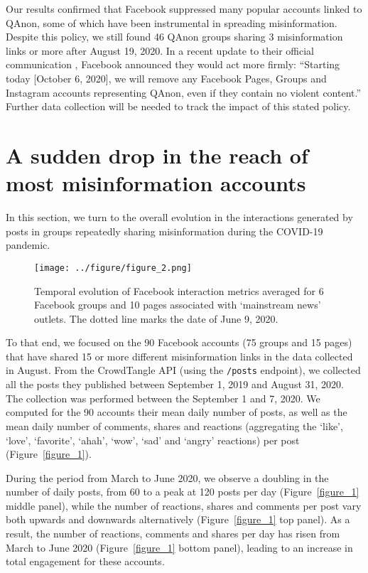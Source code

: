 \documentclass[sigconf]{acmart}
\begin{document}
Our results confirmed that Facebook suppressed many popular accounts linked to QAnon, some of which have been instrumental in spreading misinformation. Despite this policy, we still found 46 QAnon groups sharing 3 misinformation links or more after August 19, 2020. In a recent update to their official communication \cite{FacebookQAnon}, Facebook announced they would act more firmly: ``Starting today [October 6, 2020], we will remove any Facebook Pages, Groups and Instagram accounts representing QAnon, even if they contain no violent content.'' Further data collection will be needed to track the impact of this stated policy.

\section{A sudden drop in the reach of most misinformation accounts}

In this section, we turn to the overall evolution in the interactions generated by posts in groups repeatedly sharing misinformation during the COVID-19 pandemic.

\begin{figure}[h]
  \centering
  \texttt{[image: ../figure/figure\_2.png]}
  \caption{Temporal evolution of Facebook interaction metrics averaged for 6 Facebook groups and 10 pages associated with `mainstream news' outlets. The dotted line marks the date of June 9, 2020.}
  \label{figure_2}
\end{figure}

To that end, we focused on the 90 Facebook accounts (75 groups and 15 pages) that have shared 15 or more different misinformation links in the data collected in August. From the CrowdTangle API (using the \verb|/posts| endpoint), we collected all the posts they published between September 1, 2019 and August 31, 2020. The collection was performed between the September 1 and 7, 2020. We computed for the 90 accounts their mean daily number of posts, as well as the mean daily number of comments, shares and reactions (aggregating the `like', `love', `favorite', `ahah', `wow', `sad' and `angry' reactions) per post (Figure~\ref{figure_1}).

During the period from March to June 2020, we observe a doubling in the number of daily posts, from 60 to a peak at 120 posts per day (Figure~\ref{figure_1} middle panel), while the number of reactions, shares and comments per post vary both upwards and downwards alternatively (Figure~\ref{figure_1} top panel). As a result, the number of reactions, comments and shares per day has risen from March to June 2020 (Figure~\ref{figure_1} bottom panel), leading to an increase in total engagement for these accounts.
\end{document}

